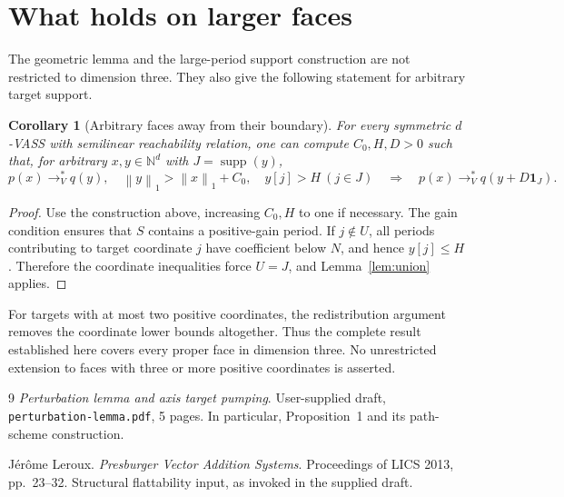 \documentclass[11pt,a4paper]{article}
\newtheorem{corollary}[theorem]{Corollary}
\theoremstyle{remark}
\newcommand{\N}{\mathbb N}
\newcommand{\supp}{\operatorname{supp}}
\newcommand{\one}{\mathbf 1}
\newcommand{\norm}[1]{\left\lVert #1\right\rVert_1}
\newcommand{\reach}{\longrightarrow_V^*}
\begin{document}
\section{What holds on larger faces}

The geometric lemma and the large-period support construction are not restricted to dimension three. They also give the following statement for arbitrary target support.

\begin{corollary}[Arbitrary faces away from their boundary]\label{cor:all-d}
For every symmetric $d$-VASS with semilinear reachability relation, one can compute $C_0,H,D>0$ such that, for arbitrary $x,y\in\N^d$ with $J=\supp(y)$,
\[
 p(x)\reach q(y),\quad \norm{y}>\norm{x}+C_0,\quad
 y[j]>H\ (j\in J)
 \quad\Longrightarrow\quad
 p(x)\reach q(y+D\one_J).
\]
\end{corollary}

\begin{proof}
Use the construction above, increasing $C_0,H$ to one if necessary. The gain condition ensures that $S$ contains a positive-gain period. If $j\notin U$, all periods contributing to target coordinate $j$ have coefficient below $N$, and hence $y[j]\le H$. Therefore the coordinate inequalities force $U=J$, and Lemma~\ref{lem:union} applies.
\end{proof}

For targets with at most two positive coordinates, the redistribution argument removes the coordinate lower bounds altogether. Thus the complete result established here covers every proper face in dimension three. No unrestricted extension to faces with three or more positive coordinates is asserted.

\begin{thebibliography}{9}
\emph{Perturbation lemma and axis target pumping}.
User-supplied draft, \texttt{perturbation-lemma.pdf}, 5 pages.
In particular, Proposition~1 and its path-scheme construction.

J\'er\^ome Leroux.
\emph{Presburger Vector Addition Systems}.
Proceedings of LICS 2013, pp.~23--32.
Structural flattability input, as invoked in the supplied draft.
\end{thebibliography}
\end{document}
